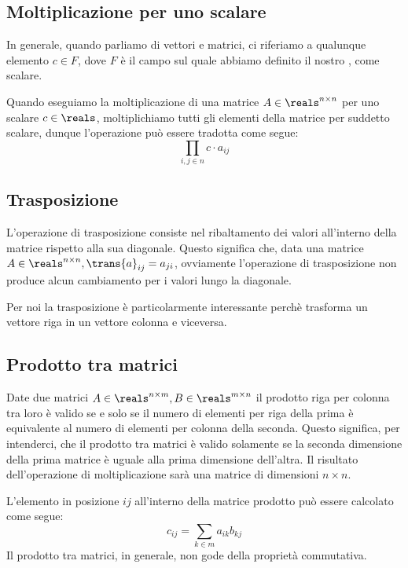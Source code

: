 \subsection{Moltiplicazione per uno scalare}
In generale, quando parliamo di vettori e matrici, ci riferiamo a qualunque elemento $c \in F$, dove $F$ è il campo sul quale abbiamo definito il nostro , come scalare.

Quando eseguiamo la moltiplicazione di una matrice $A \in \reals^{n \times n}$ per uno scalare $c \in \reals$, moltiplichiamo tutti gli elementi della matrice per suddetto scalare, dunque l'operazione può essere tradotta come segue:
\begin{equation*}
    \prod_{i, j \in n} c \cdot a_{ij}
\end{equation*}
\subsection{Trasposizione}
L'operazione di trasposizione consiste nel ribaltamento dei valori all'interno della matrice rispetto alla sua diagonale. Questo significa che, data una matrice $A \in \reals^{n \times n}, \trans{a}_{ij} = a_{ji}$, ovviamente l'operazione di trasposizione non produce alcun cambiamento per i valori lungo la diagonale.

Per noi la trasposizione è particolarmente interessante perchè trasforma un vettore riga in un vettore colonna e viceversa.
\subsection{Prodotto tra matrici}
Date due matrici $A \in \reals^{n \times m}, B \in \reals^{m \times n}$ il prodotto riga per colonna tra loro è valido se e solo se il numero di elementi per riga della prima è equivalente al numero di elementi per colonna della seconda. Questo significa, per intenderci, che il prodotto tra matrici è valido solamente se la seconda dimensione della prima matrice è uguale alla prima dimensione dell'altra.
Il risultato dell'operazione di moltiplicazione sarà una matrice di dimensioni $n \times n$.

L'elemento in posizione $ij$ all'interno della matrice prodotto può essere calcolato come segue:
\begin{equation*}
    c_{ij} = \sum_{k \in m}a_{ik}b_{kj}
\end{equation*}
Il prodotto tra matrici, in generale, non gode della proprietà commutativa.

